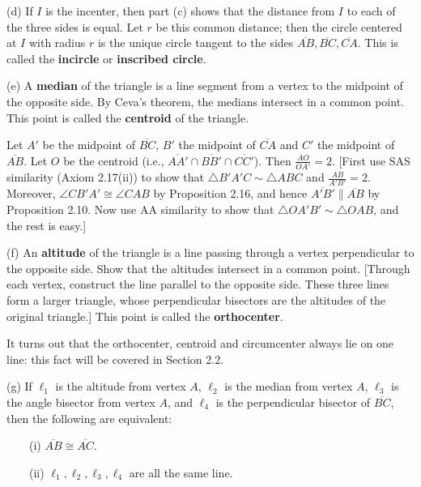 \documentclass[leqno]{book}
\begin{document}
\begin{enumerate}
(d) If $I$ is the incenter, then part (c) shows that the distance from $I$ to each of the three sides is equal.  Let $r$ be this common distance; then the circle centered at $I$ with radius $r$ is the unique circle tangent to the sides $\overline{AB},\overline{BC},\overline{CA}$.  This is called the \textbf{incircle} or \textbf{inscribed circle}.

(e) A \textbf{median} of the triangle is a line segment from a vertex to the midpoint of the opposite side.  By Ceva's theorem, the medians intersect in a common point.  This point is called the \textbf{centroid} of the triangle.

Let $A'$ be the midpoint of $\overline{BC}$, $B'$ the midpoint of $\overline{CA}$ and $C'$ the midpoint of $\overline{AB}$.  Let $O$ be the centroid (i.e., $\overline{AA'}\cap\overline{BB'}\cap\overline{CC'}$).  Then $\frac{AO}{OA'}=2$.  [First use SAS similarity (Axiom 2.17(ii)) to show that $\triangle B'A'C\sim\triangle ABC$ and $\frac{AB}{A'B'}=2$.  Moreover, $\angle CB'A'\cong\angle CAB$ by Proposition 2.16, and hence $\overline{A'B'}\parallel\overline{AB}$ by Proposition 2.10.  Now use AA similarity to show that $\triangle OA'B'\sim\triangle OAB$, and the rest is easy.]%

(f) An \textbf{altitude} of the triangle is a line passing through a vertex perpendicular to the opposite side.  Show that the altitudes intersect in a common point.  [Through each vertex, construct the line parallel to the opposite side.  These three lines form a larger triangle, whose perpendicular bisectors are the altitudes of the original triangle.]  This point is called the \textbf{orthocenter}.

It turns out that the orthocenter, centroid and circumcenter always lie on one line: this fact will be covered in Section 2.2.

(g) If $\ell_1$ is the altitude from vertex $A$, $\ell_2$ is the median from vertex $A$, $\ell_3$ is the angle bisector from vertex $A$, and $\ell_4$ is the perpendicular bisector of $\overline{BC}$, then the following are equivalent:

~~~~(i) $\overline{AB}\cong\overline{AC}$.

~~~~(ii) $\ell_1,\ell_2,\ell_3,\ell_4$ are all the same line.


\end{enumerate}
\end{document}
